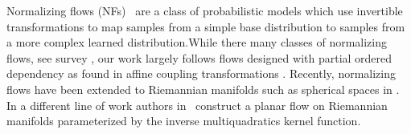 Normalizing flows (NFs)~\cite{rezende2015variational,dinh2016density} are a class of probabilistic models which use invertible transformations to map samples from a simple base distribution to samples from a more complex learned distribution.While there many classes of normalizing flows, see survey \cite{papamakarios2019normalizing,kobyzev2019normalizing}, our work largely follows flows designed with partial ordered dependency as found in affine coupling transformations \cite{dinh2016density}. 
Recently, normalizing flows have been extended to Riemannian manifolds such as spherical spaces in \cite{gemici2016normalizing}. In a different line of work authors in~\cite{wang-wang-2019-riemannian} construct a planar flow  \cite{rezende2015variational} on Riemannian manifolds parameterized by the inverse multiquadratics kernel function. %



